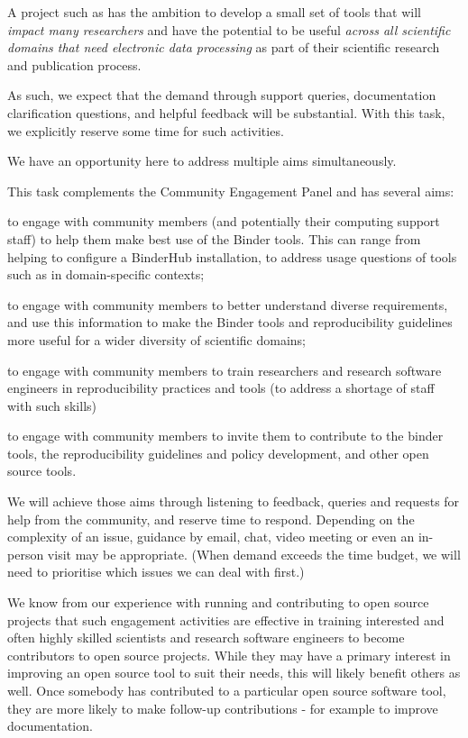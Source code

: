 \begin{task}[
  title=Community support and engagement,
  id=community-support,
  lead=SRL,
  PM=13,
  wphases={0-36!.36},
  partners={MP,QS,UIO,IFR}
]
A project such as \TheProject{} has the ambition to develop a small set of tools
that will \emph{impact many researchers} and have the potential to be useful
\emph{across all scientific domains that need electronic data processing} as part of their
scientific research and publication process.

As such, we expect that the demand through support queries, documentation
clarification questions, and helpful feedback will be substantial. With this
task, we explicitly reserve some time for such activities.

We have an opportunity here to address multiple aims simultaneously.

This task complements the Community Engagement Panel and has several aims: 
\begin{compactitem}
\item to engage with community members (and potentially their computing support
  staff) to help them make best use of the Binder tools. This can range from
  helping to configure a BinderHub installation, to address usage questions of
  tools such as \repotodocker{} in domain-specific contexts;
\item to engage with community members to better understand diverse
  requirements, and use this information to make the Binder tools and
  reproducibility guidelines more useful for a wider diversity of scientific
  domains;
\item to engage with community members to train researchers and research
  software engineers in reproducibility practices and tools (to address a
  shortage of staff with such skills)
\item to engage with community members to invite them to contribute to the
  binder tools, the reproducibility guidelines and policy development, and other
  open source tools.
\end{compactitem}

We will achieve those aims through listening to feedback, queries and requests
for help from the community, and reserve time to respond. Depending on the
complexity of an issue, guidance by email, chat, video meeting or even an
in-person visit may be appropriate. (When demand exceeds the time budget, we
will need to prioritise which issues we can deal with first.)

We know from our experience with running and contributing to open source
projects that such engagement activities are effective in training interested
and often highly skilled scientists and research software engineers to become
contributors to open source projects. While they may have a primary interest in
improving an open source tool to suit their needs, this will likely benefit
others as well. Once somebody has contributed to a particular open source
software tool, they are more likely to make follow-up contributions - for
example to improve documentation.

\end{task}
